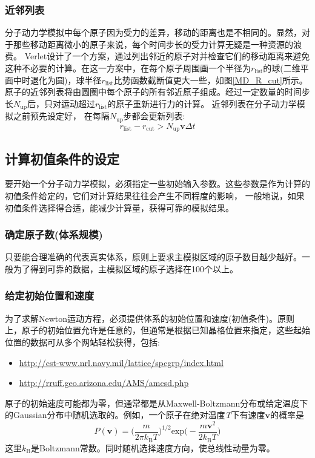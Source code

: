 \subsubsection{近邻列表}
分子动力学模拟中每个原子因为受力的差异，移动的距离也是不相同的。显然，对于那些移动距离微小的原子来说，每个时间步长的受力计算无疑是一种资源的浪费。%
\textrm{Verlet}\cite{PR159-98_1967}设计了一个方案，通过列出邻近的原子对并检查它们的移动距离来避免这种不必要的计算。在这一方案中，在每个原子周围画一个半径为$r_{\mathrm{list}}$的球(二维平面中时退化为圆)，球半径$r_{\mathrm{list}}$比势函数截断值更大一些，如图\ref{MD_R_cut}所示。%
原子的近邻列表将由圆圈中每个原子的所有邻近原子组成。经过一定数量的时间步长$N_{\mathrm{up}}$后，只对运动超过$r_{\mathrm{list}}$的原子重新进行力的计算。
近邻列表在分子动力学模拟之前预先设定好，%
在每隔$N_{\mathrm{up}}$步都会更新列表:
\begin{equation}
	r_{\mathrm{list}}-r_{\mathrm{cut}}>N_{\mathrm{up}}\mathbf{v}\Delta t
	\label{eq:r_list_circle}
\end{equation}

\subsection{计算初值条件的设定}
要开始一个分子动力学模拟，必须指定一些初始输入参数。这些参数是作为计算的初值条件给定的，它们对计算结果往往会产生不同程度的影响，%
一般地说，如果初值条件选择得合适，能减少计算量，获得可靠的模拟结果。
\subsubsection{确定原子数(体系规模)}
只要能合理准确的代表真实体系，原则上要求主模拟区域的原子数目越少越好。一般为了得到可靠的数据，主模拟区域的原子选择在100个以上。
\subsubsection{给定初始位置和速度}
为了求解\textrm{Newton}运动方程，必须提供体系的初始位置和速度(初值条件)。原则上，原子的初始位置允许是任意的，但通常是根据已知晶格位置来指定，这些起始位置的数据可从多个网站轻松获得，包括:
\begin{itemize}
	\item \url{http://cst-www.nrl.navy.mil/lattice/spcgrp/index.html}
	\item \url{http://rruff.geo.arizona.edu/AMS/amcsd.php}
\end{itemize}
原子的初始速度可能都为零，但通常都是从\textrm{Maxwell-Boltzmann}分布或给定温度下的\textrm{Gaussian}分布中随机选取的。例如，一个原子在绝对温度\textit{T}下有速度$\mathbf{v}$的概率是
\begin{equation}
	P(\mathbf{v})=\bigg(\dfrac{m}{2\pi k_{\mathrm{B}}T}\bigg)^{1/2}\mathrm{exp}\bigg(-\dfrac{m\mathbf{v}^2}{2k_{\mathrm{B}}T}\bigg)
	\label{eq:v-MB}
\end{equation}
这里$k_{\mathrm{B}}$是\textrm{Boltzmann}常数。同时随机选择速度方向，使总线性动量为零。
